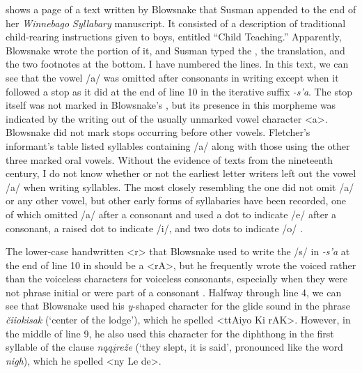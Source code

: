 \documentclass[output=paper]{LSP/langsci}
\begin{document}
 shows a page of a  text written by Blowsnake that Susman appended to the end of her \emph{Winnebago Syllabary} manuscript. It consisted of a description of traditional child-rearing instructions given to boys, entitled ``Child Teaching.'' Apparently, Blowsnake wrote the  portion of it, and Susman typed the , the  translation, and the two footnotes at the bottom. I have numbered the lines. In this text, we can see that the vowel /a/ was omitted after consonants in   writing except when it followed a  stop as it did at the end of line 10 in the iterative suffix \emph{-s'a}. The  stop itself was not marked in Blowsnake's , but its presence in this morpheme was indicated by the writing out of the usually unmarked vowel character <a>. Blowsnake did not mark  stops occurring before other vowels. Fletcher's informant's  table listed syllables containing /a/ along with those using the other three marked  oral vowels. Without the evidence of   texts from the nineteenth century, I do not know whether or not the earliest  letter writers left out the vowel /a/ when writing syllables. The   most closely resembling the  one did not omit /a/ or any other vowel, but other early forms of  syllabaries have been recorded, one of which omitted /a/ after a consonant and used a dot to indicate /e/ after a consonant, a raised dot to indicate /i/, and two dots to indicate /o/ \citep[158--159]{Walker1981}.

The lower-case handwritten <r> that Blowsnake used to write the /s/ in \emph{-s'a} at the end of line 10 in  should be a <rA>, but he frequently wrote the voiced rather than the voiceless  characters for voiceless consonants, especially when they were not phrase initial or were part of a consonant . Halfway through line 4, we can see that Blowsnake used his \emph{y}-shaped  character for the glide sound in the phrase \emph{\v{c}iiokisak} (`center of the lodge'), which he spelled <ttAiyo Ki rAK>. However, in the middle of line 9, he also used this  character for the diphthong in the first syllable of the clause \emph{n\k{a}\k{a}\k{i}re\v{z}e} (`they slept, it is said', pronounced like the  word \emph{nigh}), which he spelled <ny Le de>.  
\end{document}
